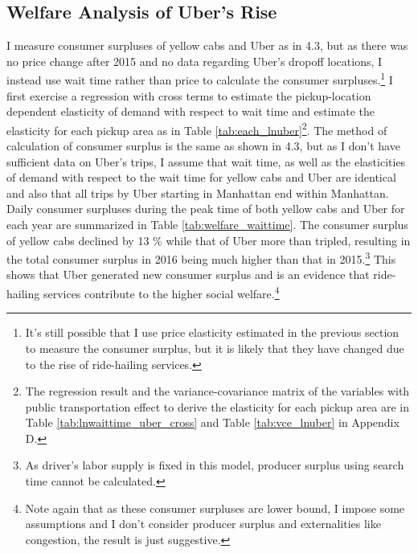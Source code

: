 \vspace{0.5cm}

\subsection{Welfare Analysis of Uber's Rise}
\hspace{0.5cm} I measure consumer surpluses of yellow cabs and Uber as in 4.3, but as there was no price change after 2015 and no data regarding Uber's dropoff locations, I instead use wait time rather than price to calculate the consumer surpluses.\footnote{It's still possible that I use price elasticity estimated in the previous section to measure the consumer surplus, but it is likely that they have changed due to the rise of ride-hailing services.} I first exercise a regression with cross terms to estimate the pickup-location dependent elasticity of demand with respect to wait time and estimate the elasticity for each pickup area as in Table \ref{tab:each_lnuber}\footnote{The regression result and the variance-covariance matrix of the variables with public transportation effect to derive the elasticity for each pickup area are in Table \ref{tab:lnwaittime_uber_cross} and Table \ref{tab:vce_lnuber} in Appendix D.}. The method of calculation of consumer surplus is the same as shown in 4.3, but as I don't have sufficient data on Uber's trips, I assume that wait time, as well as the elasticities of demand with respect to the wait time for yellow cabs and Uber are identical and also that all trips by Uber starting in Manhattan end within Manhattan. Daily consumer surpluses during the peak time of both yellow cabs and Uber for each year are summarized in Table \ref{tab:welfare_waittime}. The consumer surplus of yellow cabs declined by 13 \% while that of Uber more than tripled, resulting in the total consumer surplus in 2016 being much higher than that in 2015.\footnote{As driver's labor supply is fixed in this model, producer surplus using search time cannot be calculated.} This shows that Uber generated new consumer surplus and is an evidence that ride-hailing services contribute to the higher social welfare.\footnote{Note again that as these consumer surpluses are lower bound, I impose some assumptions and I don't consider producer surplus and externalities like congestion, the result is just suggestive.}





